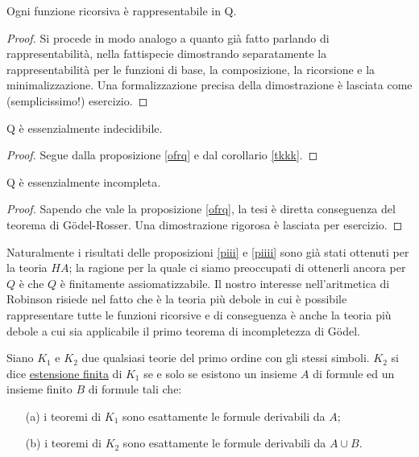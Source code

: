 \begin{prop}
\label{ofrq}
Ogni funzione ricorsiva è rappresentabile in Q.
\end{prop}
\begin{proof}
Si procede in modo analogo a quanto già fatto parlando di rappresentabilità,
 nella fattispecie dimostrando separatamente la rappresentabilità
per le funzioni di base, la composizione, la ricorsione e la minimalizzazione. Una
formalizzazione precisa della dimostrazione è lasciata come (semplicissimo!) esercizio.
\end{proof}

\begin{prop}
\label{piii}
Q è essenzialmente indecidibile.
\end{prop}
\begin{proof}
Segue dalla proposizione \ref{ofrq} e dal corollario \ref{tkkk}.
\end{proof}

\begin{prop}
\label{piiii}
Q è essenzialmente incompleta.
\end{prop}
\begin{proof}
Sapendo che vale la proposizione \ref{ofrq}, la tesi è diretta conseguenza del 
teorema di Gödel-Rosser. Una dimostrazione rigorosa è lasciata per esercizio.
\end{proof}

Naturalmente i risultati delle proposizioni \ref{piii} e \ref{piiii} sono già stati ottenuti per la
teoria $HA$; la ragione per la quale ci siamo preoccupati di ottenerli ancora per $Q$
è che $Q$ è finitamente assiomatizzabile. \newline
Il nostro interesse nell'aritmetica di Robinson risiede nel fatto che è la teoria più debole
 in cui è possibile rappresentare tutte le funzioni ricorsive e di conseguenza è anche la teoria
 più debole a cui sia applicabile il primo teorema di incompletezza di Gödel. \newline

\begin{defi}
Siano $K_1$ e $K_2$ due qualsiasi teorie del primo ordine con gli stessi simboli. 
$K_2$ si dice \underline{estensione finita} di $K_1$ se e solo se esistono un insieme
 $A$ di formule ed un insieme finito $B$ di formule tali che:
\begin{itemize}
 \item [(a)] i teoremi di $K_1$ sono esattamente le formule derivabili da $A$;
 \item [(b)] i teoremi di $K_2$ sono esattamente le formule derivabili da $A \cup B$.
\end{itemize}
\end{defi}

